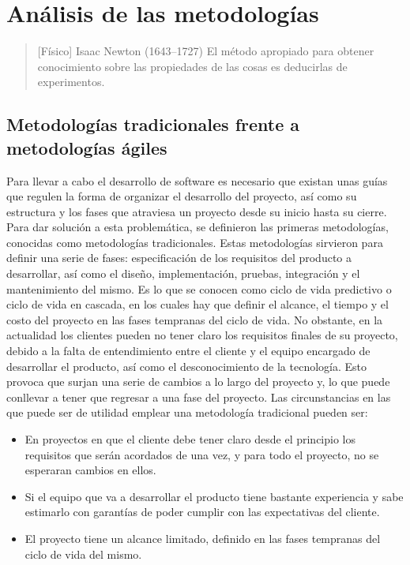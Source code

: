 \chapter{Análisis de las metodologías}

\begin{quotation}[Físico] {Isaac Newton (1643--1727)}
El método apropiado para obtener conocimiento sobre las propiedades de las cosas es deducirlas de experimentos.
\end{quotation}

\begin{abstract}
Antes de comenzar incluso con la planificación del proyecto se ha de definir cómo se hará, por ello analicemos las metodologías que se han tenido en cuento para el desarrollo del proyecto.
\end{abstract}

\section{Metodologías tradicionales frente a metodologías ágiles}

Para llevar a cabo el desarrollo de software es necesario que existan unas guías que regulen la forma de organizar el desarrollo del proyecto, así como su estructura y los fases que atraviesa un proyecto desde su inicio hasta su cierre.
Para dar solución a esta problemática, se definieron las primeras metodologías, conocidas como metodologías tradicionales. Estas metodologías sirvieron para definir una serie de fases: especificación de los requisitos del producto a desarrollar, así como el diseño, implementación, pruebas, integración y el mantenimiento del mismo. Es lo que se conocen como ciclo de vida predictivo o ciclo de vida en cascada, en los cuales hay que definir el alcance, el tiempo y el costo del proyecto en las fases tempranas del ciclo de vida.
No obstante, en la actualidad los clientes pueden no tener claro los requisitos finales de su proyecto, debido a la falta de entendimiento entre el cliente y el equipo encargado de desarrollar el producto, así como el desconocimiento de la tecnología. Esto provoca que surjan una serie de cambios a lo largo del proyecto y, lo que puede conllevar a tener que regresar a una fase del proyecto.
Las circunstancias en las que puede ser de utilidad emplear una metodología tradicional pueden ser:

\begin{itemize}

\item En proyectos en que el cliente debe tener claro desde el principio los requisitos que serán acordados de una vez, y para todo el proyecto, no se esperaran cambios en ellos. 

\item Si el equipo que va a desarrollar el producto tiene bastante experiencia y sabe estimarlo con garantías de poder cumplir con las expectativas del cliente.

\item El proyecto tiene un alcance limitado, definido en las fases tempranas del ciclo de vida del mismo.

\end{itemize}

